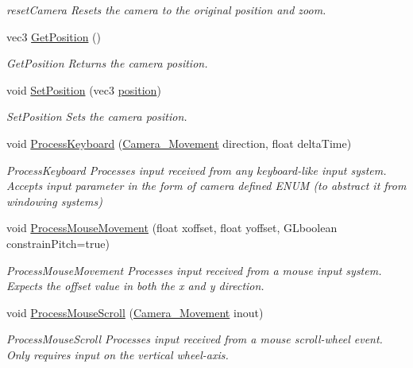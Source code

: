 \begin{DoxyCompactItemize}
\begin{DoxyCompactList}\small\item\em reset\+Camera Resets the camera to the original position and zoom. \end{DoxyCompactList}\item 
\mbox{\label{classCamera_aa645c28c6739e6ede0a238e8b3587d69}} 
vec3 \hyperlink{classCamera_aa645c28c6739e6ede0a238e8b3587d69}{Get\+Position} ()
\begin{DoxyCompactList}\small\item\em Get\+Position Returns the camera position. \end{DoxyCompactList}\item 
\mbox{\label{classCamera_ab31c607f43c69ca3b625589675a225c6}} 
void \hyperlink{classCamera_ab31c607f43c69ca3b625589675a225c6}{Set\+Position} (vec3 \hyperlink{classCamera_a6bd96884fb5fb652b71042f2d7f0122c}{position})
\begin{DoxyCompactList}\small\item\em Set\+Position Sets the camera position. \end{DoxyCompactList}\item 
void \hyperlink{classCamera_aebba33a8b281fe2598bcafc54a55d296}{Process\+Keyboard} (\hyperlink{classCamera_a910e91793a0078a11eef1cba77dec353}{Camera\+\_\+\+Movement} direction, float delta\+Time)
\begin{DoxyCompactList}\small\item\em Process\+Keyboard Processes input received from any keyboard-\/like input system. Accepts input parameter in the form of camera defined E\+N\+UM (to abstract it from windowing systems) \end{DoxyCompactList}\item 
void \hyperlink{classCamera_a656c2a8dc40150874f15bce47b789751}{Process\+Mouse\+Movement} (float xoffset, float yoffset, G\+Lboolean constrain\+Pitch=true)
\begin{DoxyCompactList}\small\item\em Process\+Mouse\+Movement Processes input received from a mouse input system. Expects the offset value in both the x and y direction. \end{DoxyCompactList}\item 
void \hyperlink{classCamera_a17373e11b6b64a0568ce2a03b48ec067}{Process\+Mouse\+Scroll} (\hyperlink{classCamera_a910e91793a0078a11eef1cba77dec353}{Camera\+\_\+\+Movement} inout)
\begin{DoxyCompactList}\small\item\em Process\+Mouse\+Scroll Processes input received from a mouse scroll-\/wheel event. Only requires input on the vertical wheel-\/axis. \end{DoxyCompactList}\end{DoxyCompactItemize}
